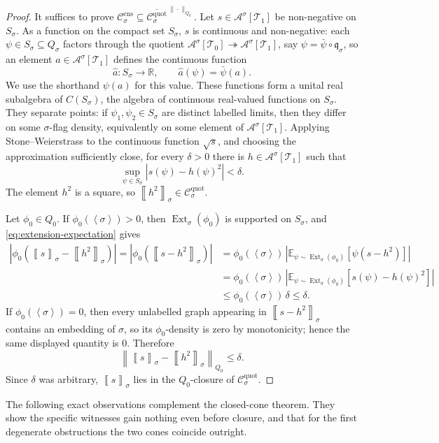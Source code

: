 \documentclass[11pt]{article}
\theoremstyle{definition}
\newcommand{\R}{\mathbb{R}}
\newcommand{\E}{\mathbb{E}}
\newcommand{\A}{\mathcal{A}}
\newcommand{\T}{\mathcal{T}}
\newcommand{\C}{\mathcal{C}}
\newcommand{\Ext}{\operatorname{Ext}}
\newcommand{\brak}[1]{\left\langle #1\right\rangle}
\newcommand{\avg}[2]{\left\llbracket #1 \right\rrbracket_{#2}}
\newcommand{\qmap}{\mathfrak q}
\begin{document}
\begin{proof}
It suffices to prove
$\C^{\mathrm{ens}}_\sigma\subseteq
\overline{\C^{\mathrm{quot}}_\sigma}^{\,\|\cdot\|_{Q_0}}$.
Let $s\in\A^\sigma[\T_1]$ be non-negative on $S_\sigma$.  As a function on the
compact set $S_\sigma$, $s$ is continuous and non-negative: each
$\psi\in S_\sigma\subseteq Q_\sigma$ factors through the quotient
$\A^\sigma[\T_0]\twoheadrightarrow\A^\sigma[\T_1]$, say
$\psi=\bar\psi\circ\qmap_\sigma$, so an element
$a\in\A^\sigma[\T_1]$ defines the continuous function
\[
  \widehat a:S_\sigma\to\R,\qquad \widehat a(\psi)=\bar\psi(a).
\]
We use the shorthand $\psi(a)$ for this value.  These functions form a unital real
subalgebra of $C(S_\sigma)$, the algebra of continuous real-valued functions on
$S_\sigma$.  They separate points:
if $\psi_1,\psi_2\in S_\sigma$ are distinct labelled limits, then they differ on some
$\sigma$-flag density, equivalently on some element of $\A^\sigma[\T_1]$.  Applying
Stone--Weierstrass to the continuous function $\sqrt{s}$, and choosing the approximation
sufficiently close, for every
$\delta>0$ there is $h\in\A^\sigma[\T_1]$ such that
\[
  \sup_{\psi\in S_\sigma}\left|s(\psi)-h(\psi)^2\right|<\delta .
\]
The element $h^2$ is a square, so $\avg{h^2}{\sigma}\in\C^{\mathrm{quot}}_\sigma$.

Let $\phi_0\in Q_0$.  If $\phi_0(\brak\sigma)>0$, then
$\Ext_\sigma(\phi_0)$ is supported on $S_\sigma$, and
\eqref{eq:extension-expectation} gives
\begin{align*}
  \left|\phi_0\!\left(\avg{s}{\sigma}-\avg{h^2}{\sigma}\right)\right| 
  =
  \left|\phi_0\!\left(\avg{s-h^2}{\sigma}\right)\right|
  & =
  \phi_0(\brak\sigma)\,
  \left|\E_{\psi\sim\Ext_\sigma(\phi_0)}[\psi(s-h^2)]\right|
  \\
  & = 
  \phi_0(\brak\sigma)\,
  \left|\E_{\psi\sim\Ext_\sigma(\phi_0)}[s(\psi)-h(\psi)^2]\right|
  \\
  & 
  \le \phi_0(\brak\sigma)\,\delta
  \le \delta .
\end{align*}
If $\phi_0(\brak\sigma)=0$, then every unlabelled graph appearing in
$\avg{s-h^2}{\sigma}$ contains an embedding of $\sigma$, so its $\phi_0$-density is zero
by monotonicity; hence the same displayed quantity is $0$.  Therefore
\[
  \left\|\avg{s}{\sigma}-\avg{h^2}{\sigma}\right\|_{Q_0}\le\delta .
\]
Since $\delta$ was arbitrary, $\avg{s}{\sigma}$ lies in the
$Q_0$-closure of $\C^{\mathrm{quot}}_\sigma$.
\end{proof}

The following exact observations complement the closed-cone theorem.  They show the
specific witnesses gain nothing even before closure, and that for the first
degenerate obstructions the two cones coincide outright.
\end{document}
